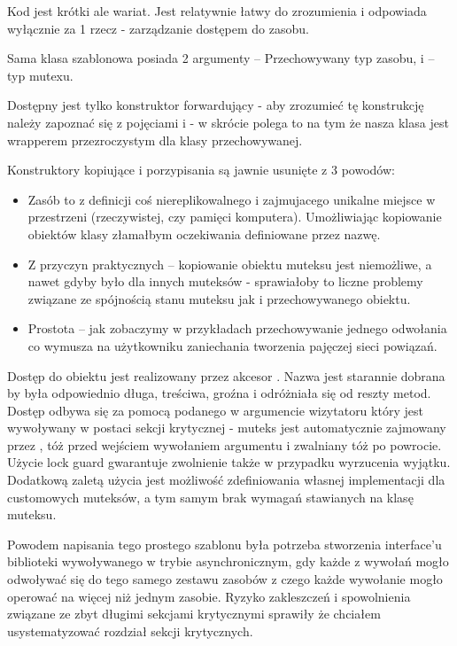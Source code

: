 
Kod jest krótki ale wariat. Jest relatywnie łatwy do zrozumienia i odpowiada wyłącznie za 1 rzecz - zarządzanie dostępem do zasobu.

Sama klasa szablonowa posiada 2 argumenty  -- Przechowywany typ zasobu, i  -- typ mutexu.

Dostępny jest tylko konstruktor forwardujący - aby zrozumieć tę konstrukcję należy zapoznać się z pojęciami  i  - w skrócie polega to na tym że nasza klasa  jest wrapperem przezroczystym dla klasy przechowywanej.

Konstruktory kopiujące i porzypisania są jawnie usunięte z 3 powodów:
\begin{itemize}
\item Zasób to z definicji coś niereplikowalnego i zajmujacego unikalne miejsce w przestrzeni (rzeczywistej, czy pamięci komputera). Umożliwiając kopiowanie obiektów klasy  złamałbym oczekiwania definiowane przez nazwę.
\item Z przyczyn praktycznych -- kopiowanie obiektu muteksu jest niemożliwe, a nawet gdyby było dla innych muteksów - sprawiałoby to liczne problemy związane ze spójnością stanu muteksu jak i przechowywanego obiektu.
\item Prostota -- jak zobaczymy w przykładach przechowywanie jednego odwołania co wymusza na użytkowniku zaniechania tworzenia pajęczej sieci powiązań.
\end{itemize}

Dostęp do obiektu jest realizowany przez akcesor . Nazwa jest starannie dobrana by była odpowiednio długa, treściwa, groźna i odróżniała się od reszty metod. Dostęp odbywa się za pomocą podanego w argumencie wizytatoru który jest wywoływany w postaci sekcji krytycznej - muteks jest automatycznie zajmowany przez , tóż przed wejściem wywołaniem argumentu i zwalniany tóż po powrocie. Użycie lock guard gwarantuje zwolnienie także w przypadku wyrzucenia wyjątku. Dodatkową zaletą użycia  jest możliwość zdefiniowania własnej implementacji dla customowych muteksów, a tym samym brak wymagań stawianych na klasę muteksu.

Powodem napisania tego prostego szablonu była potrzeba stworzenia interface'u biblioteki wywoływanego w trybie asynchronicznym, gdy każde z wywołań mogło odwoływać się do tego samego zestawu zasobów z czego każde wywołanie mogło operować na więcej niż jednym zasobie. Ryzyko zakleszczeń i spowolnienia związane ze zbyt długimi sekcjami krytycznymi sprawiły że chciałem usystematyzować rozdział sekcji krytycznych.
